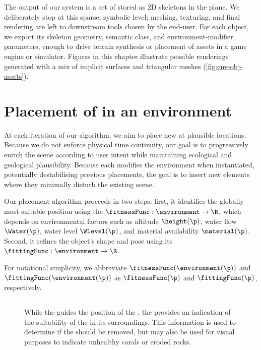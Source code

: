 The output of our system is a set of  stored as 2D skeletons in the plane. We deliberately stop at this sparse, symbolic level; meshing, texturing, and final rendering are left to downstream tools chosen by the end-user. For each object, we export its skeleton geometry, semantic class, and environment-modifier parameters, enough to drive terrain synthesis or placement of assets in a game engine or simulator. Figures in this chapter illustrate possible renderings generated with a mix of implicit surfaces and triangular meshes (\cref{fig:env-obj-assets}).

\section{Placement of  in an environment}
\label{sec:env-obj-generation-rules}

At each iteration of our algorithm, we aim to place new  at plausible locations. Because we do not enforce physical time continuity, our goal is to progressively enrich the scene according to user intent while maintaining ecological and geological plausibility.
Because each  modifies the environment when instantiated, potentially destabilising previous placements, the goal is to insert new elements where they minimally disturb the existing scene.

Our placement algorithm proceeds in two steps: first, it identifies the globally most suitable position using the  $\fitnessFunc: \environment \to \R$, which depends on environmental factors such as altitude $\height(\p)$, water flow $\Water(\p)$, water level $\Wlevel(\p)$, and material availability $\material(\p)$. Second, it refines the object's shape and pose using its  $\fittingFunc: \environment \to \R$.

For notational simplicity, we abbreviate $\fitnessFunc(\environment(\p))$ and $\fittingFunc(\environment(\p))$ as $\fitnessFunc(\p)$ and $\fittingFunc(\p)$, respectively.

\subsection{}

\begin{figure}
    \caption{While the  guides the position of the , the  provides an indication of the suitability of the  in its surroundings. This information is used to determine if the  should be removed, but may also be used for visual purposes to indicate unhealthy corals or eroded rocks.}
    \label{fig:env-obj-procedural-erosion}
\end{figure}

